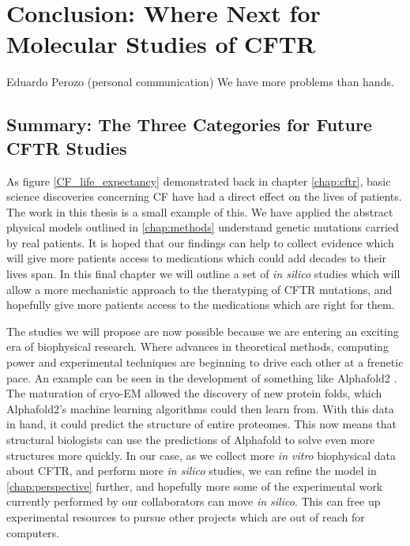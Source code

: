 \chapter{Conclusion: Where Next for Molecular Studies of CFTR}
\label{chap:conclusion}
\begin{chapquote} {Eduardo Perozo (personal communication)}
We have more problems than hands. 
\end{chapquote}


\section{Summary: The Three Categories for Future CFTR Studies}

As figure \ref{CF_life_expectancy} demonstrated back in chapter \ref{chap:cftr}, basic science discoveries concerning CF have had a direct effect on the lives of patients. The work in this thesis is a small example of this. We have applied the abstract physical models outlined in \ref{chap:methods} understand genetic mutations carried by real patients. It is hoped that our findings can help to collect evidence which will give more patients access to medications which could add decades to their lives span. In this final chapter we will outline a set of \textit{in silico} studies which will allow a more mechanistic approach to the theratyping of CFTR mutations, and hopefully give more patients access to the medications which are right for them.  

The studies we will propose are now possible because we are entering an exciting era of biophysical research. Where advances in theoretical methods, computing power and experimental techniques are beginning to drive each other at a frenetic pace. An example can be seen in the development of something like Alphafold2 \cite{jumper2021}. The maturation of cryo-EM allowed the discovery of new protein folds, which Alphafold2's machine learning algorithms could then learn from. With this data in hand, it could predict the structure of entire proteomes. This now means that structural biologists can use the predictions of Alphafold to solve even more structures more quickly. In our case, as we collect more \textit{in vitro} biophysical data about CFTR, and perform more \textit{in silico} studies, we can refine the model in \ref{chap:perspective} further, and hopefully more some of the experimental work currently performed by our collaborators can move \textit{in silico}. This can free up experimental resources to pursue other projects which are out of reach for computers. 

